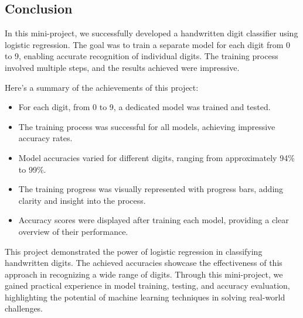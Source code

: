\documentclass[11pt]{article}
\providecommand{\tightlist}{%
      \setlength{\itemsep}{0pt}\setlength{\parskip}{0pt}}
\begin{document}
\begin{center}
\end{center}

    \hypertarget{conclusion}{%
\subsection{Conclusion}\label{conclusion}}

In this mini-project, we successfully developed a handwritten digit
classifier using logistic regression. The goal was to train a separate
model for each digit from 0 to 9, enabling accurate recognition of
individual digits. The training process involved multiple steps, and the
results achieved were impressive.

Here's a summary of the achievements of this project:

\begin{itemize}
\tightlist
\item
  For each digit, from 0 to 9, a dedicated model was trained and tested.
\item
  The training process was successful for all models, achieving
  impressive accuracy rates.
\item
  Model accuracies varied for different digits, ranging from
  approximately 94\% to 99\%.
\item
  The training progress was visually represented with progress bars,
  adding clarity and insight into the process.
\item
  Accuracy scores were displayed after training each model, providing a
  clear overview of their performance.
\end{itemize}

This project demonstrated the power of logistic regression in
classifying handwritten digits. The achieved accuracies showcase the
effectiveness of this approach in recognizing a wide range of digits.
Through this mini-project, we gained practical experience in model
training, testing, and accuracy evaluation, highlighting the potential
of machine learning techniques in solving real-world challenges.


    
    
    
\end{document}
